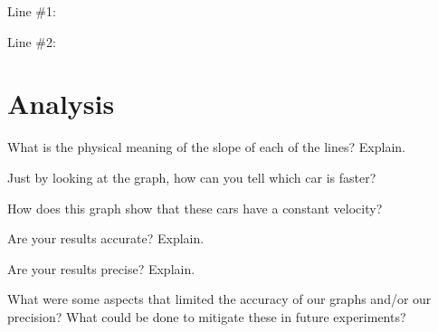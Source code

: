 \documentclass[10pt]{exam}
\begin{document}
    \vspace{1em}

    Line \#1:

    \vspace{2em}

    Line \#2:
  
    \vspace{1em}

\section*{Analysis}

\begin{questions}

  \question
    What is the physical meaning of the slope of each of the lines?  Explain.
    \vs

  \question
    Just by looking at the graph, how can you tell which car is faster?
    \vs
    
  \question
    How does this graph show that these cars have a constant velocity?
    \vs
  
  \question
    Are your results accurate?  Explain.
    \vs
  
  \question
    Are your results precise?  Explain.
    \vs

  \question
    What were some aspects that limited the accuracy of our graphs and/or our precision?  What could be done to mitigate these in future experiments?
    \vs
  
  


\end{questions}
\end{document}

